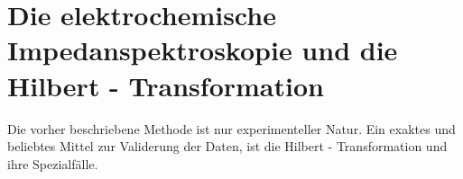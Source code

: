                                                                                                                                                                                                                                                                                                                                                                                                                                                                                                                                                                                                                                                                                                                                                                                                                                                                                                                                                                                                                                                                                                                                                                                                                   \section{Die elektrochemische Impedanspektroskopie und die Hilbert - Transformation}
                                                                                                                                                                                                                                                                                                                                                                                                                                                                                                                                                                                                                                                                                                                                                                                                                                                                                                                                                                                                                                                                                                                                                                                                                  Die vorher beschriebene Methode ist nur experimenteller Natur. Ein exaktes und beliebtes Mittel zur Validerung der Daten, ist die Hilbert - Transformation und ihre Spezialfälle.   \\\\
